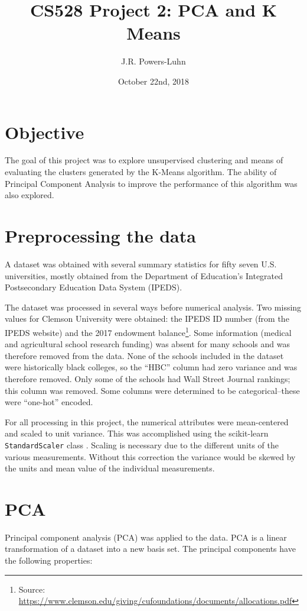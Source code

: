 \documentclass{article}
\author{J.R. Powers-Luhn}
\title{CS528 Project 2: PCA and K Means}
\date{October 22nd, 2018}
\begin{document}
	\maketitle
	
	\section{Objective}
	The goal of this project was to explore unsupervised clustering and means of evaluating the 
	clusters generated by the K-Means algorithm. The ability of Principal Component Analysis to 
	improve the performance of this algorithm was also explored.
	
	\section{Preprocessing the data}
	A dataset was obtained with several summary statistics for fifty seven U.S. universities, 
	mostly obtained from the Department of Education's Integrated Postsecondary Education Data System (IPEDS).
	
	The dataset was processed in several ways before numerical analysis. Two missing values for 
	Clemson University were obtained: the IPEDS ID number (from the IPEDS website) and the 2017 
	endowment balance\footnote{Source: \url{https://www.clemson.edu/giving/cufoundations/documents/allocations.pdf}}. 
	Some information (medical and agricultural school research funding) was absent for many schools 
	and was therefore removed from the data. None of the schools included in the dataset were 
	historically black colleges, so the ``HBC'' column had zero variance and was therefore removed. 
	Only some of the schools had Wall Street Journal rankings; this column was removed. Some columns 
	were determined to be categorical--these were ``one-hot'' encoded.
	
	For all processing in this project, the numerical attributes were mean-centered and scaled to 
	unit variance. This was accomplished using the scikit-learn \texttt{StandardScaler} class 
	\cite{scikit-learn}. Scaling is necessary due to the different units of the various measurements. 
	Without this correction the variance would be skewed by the units and mean value of the individual 
	measurements.
	
	\section{PCA}
	Principal component analysis (PCA) was applied to the data. PCA is a linear transformation of a 
	dataset into a new basis set. The principal components have the following properties:
	
\end{document}
